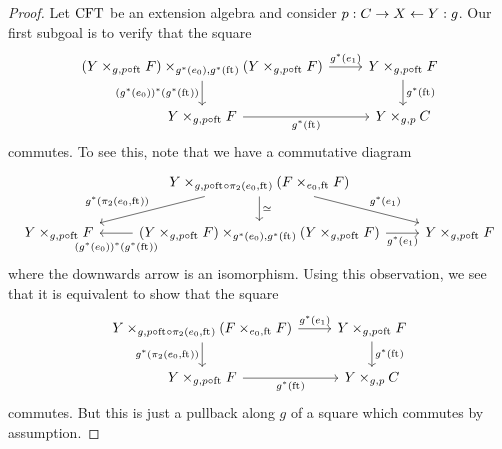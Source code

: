 \begin{proof}
Let $\mathrm{CFT}$ be an extension algebra and consider $p:C\rightarrow X\leftarrow Y:g$.
Our first subgoal is to verify that the square
\begin{equation*}
\begin{tikzcd}
\pullback%
  {\pullback{Y}{\stesysf}{g}{p\circ\eft}}%
  {\pullback{Y}{\stesysf}{g}{p\circ\eft}}%
  {g^\ast(\ectxext)}%
  {g^\ast(\eft)}
  \ar{r}{g^\ast(\efamext)} 
  \ar{d}[swap]{(g^\ast(\ectxext))^\ast(g^\ast(\eft))} 
  & 
\pullback{Y}{\stesysf}{g}{p\circ\eft}
  \ar{d}{g^\ast(\eft)}
  \\
\pullback{Y}{\stesysf}{g}{p\circ\eft}
  \ar{r}[swap]{g^\ast(\eft)} 
  & 
\pullback{Y}{\stesysc}{g}{p}
\end{tikzcd}
\end{equation*}
commutes. To see this, note that we have a commutative diagram
\begin{equation*}
\begin{tikzcd}
{}&
  \pullback%
  {Y}
  {\pullback{\stesysf}{\stesysf}{\ectxext}{\eft}}
  {g}
  {p\circ\eft\circ\pullbackpr{2}{\ectxext}{\eft}}
  \ar{dl}[swap]{g^\ast(\pullbackpr{2}{\ectxext}{\eft})}
  \ar{dr}{g^\ast(\efamext)}
  \ar{d}{\simeq}
  \\
\pullback{Y}{\stesysf}{g}{p\circ\eft}
  &
\pullback%
  {\pullback{Y}{\stesysf}{g}{p\circ\eft}}
  {\pullback{Y}{\stesysf}{g}{p\circ\eft}}
  {g^\ast(\ectxext)}
  {g^\ast(\eft)}
  \ar{r}[swap]{g^\ast(\efamext)}
  \ar{l}[yshift=-1ex]{(g^\ast(\ectxext))^\ast(g^\ast(\eft))}
  &
\pullback{Y}{\stesysf}{g}{p\circ\eft}
\end{tikzcd}
\end{equation*}
where the downwards arrow is an isomorphism. Using this observation, we see that
it is equivalent to show that the square
\begin{equation*}
\begin{tikzcd}
\pullback%
  {Y}
  {\pullback{\stesysf}{\stesysf}{\ectxext}{\eft}}
  {g}
  {p\circ\eft\circ\pullbackpr{2}{\ectxext}{\eft}}
  \ar{r}{g^\ast(\efamext)} 
  \ar{d}[swap]{g^\ast(\pullbackpr{2}{\ectxext}{\eft})} 
  & 
\pullback{Y}{\stesysf}{g}{p\circ\eft}
  \ar{d}{g^\ast(\eft)}
  \\
\pullback{Y}{\stesysf}{g}{p\circ\eft}
  \ar{r}[swap]{g^\ast(\eft)} 
  & 
\pullback{Y}{\stesysc}{g}{p}
\end{tikzcd}
\end{equation*}
commutes. But this is just a pullback along $g$ of a square which commutes by assumption.


\end{proof}
